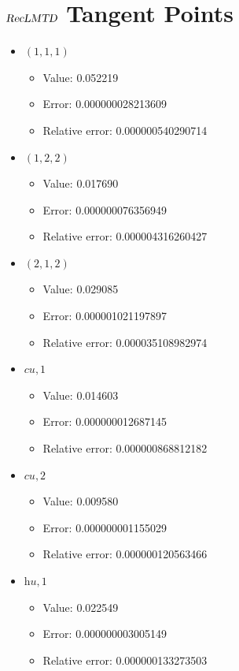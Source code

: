 \documentclass{article}%
\begin{document}
\section{$\textsl{RecLMTD}$ Tangent Points}%
\thispagestyle{plain}%
\begin{itemize}%
	\item $(1, 1, 1)$%
	\begin{itemize}%
		\item Value: 0.052219%
		\item Error: 0.000000028213609%
		\item Relative error: 0.000000540290714%
	\end{itemize}%
	\item $(1, 2, 2)$%
	\begin{itemize}%
		\item Value: 0.017690%
		\item Error: 0.000000076356949%
		\item Relative error: 0.000004316260427%
	\end{itemize}%
	\item $(2, 1, 2)$%
	\begin{itemize}%
		\item Value: 0.029085%
		\item Error: 0.000001021197897%
		\item Relative error: 0.000035108982974%
	\end{itemize}%
	\item $\textit{cu},1$%
	\begin{itemize}%
		\item Value: 0.014603%
		\item Error: 0.000000012687145%
		\item Relative error: 0.000000868812182%
	\end{itemize}%
	\item $\textit{cu},2$%
	\begin{itemize}%
		\item Value: 0.009580%
		\item Error: 0.000000001155029%
		\item Relative error: 0.000000120563466%
	\end{itemize}%
	\item $\textit{hu},1$%
	\begin{itemize}%
		\item Value: 0.022549%
		\item Error: 0.000000003005149%
		\item Relative error: 0.000000133273503%
	\end{itemize}%
\end{itemize}%
\end{document}
